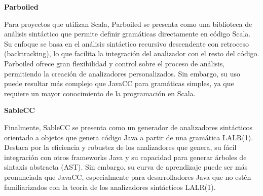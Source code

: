 \phantom{text}

\noindent \textbf{Parboiled}

\phantom{text}

Para proyectos que utilizan Scala, Parboiled se presenta como una biblioteca de análisis sintáctico que permite definir gramáticas directamente en código Scala. Su enfoque se basa en el análisis sintáctico recursivo descendente con retroceso (backtracking), lo que facilita la integración del analizador con el resto del código\cite{parboiled}. Parboiled ofrece gran flexibilidad y control sobre el proceso de análisis, permitiendo la creación de analizadores personalizados. Sin embargo, su uso puede resultar más complejo que JavaCC para gramáticas simples, ya que requiere un mayor conocimiento de la programación en Scala.

\phantom{text}

\noindent \textbf{SableCC}

\phantom{text}

Finalmente, SableCC se presenta como un generador de analizadores sintácticos orientado a objetos que genera código Java a partir de una gramática LALR(1)\cite{sablecc}. Destaca por la eficiencia y robustez de los analizadores que genera, su fácil integración con otros frameworks Java y su capacidad para generar árboles de sintaxis abstracta (AST). Sin embargo, su curva de aprendizaje puede ser más pronunciada que JavaCC, especialmente para desarrolladores Java que no estén familiarizados con la teoría de los analizadores sintácticos LALR(1).





